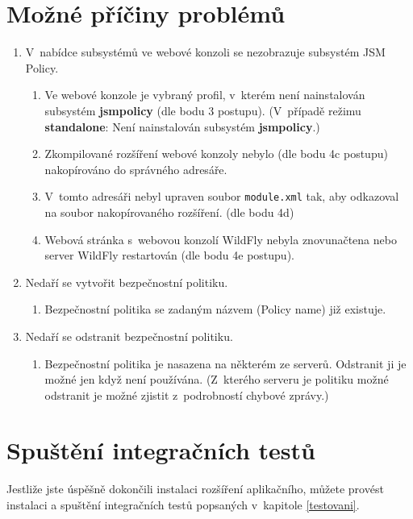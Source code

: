 \section{Možné příčiny problémů}
\begin{enumerate}
    \item V~nabídce subsystémů ve webové konzoli se nezobrazuje subsystém JSM Policy.
    \begin{enumerate}
        \item Ve webové konzole je vybraný profil, v~kterém není nainstalován subsystém {\bf jsmpolicy} (dle bodu 3 postupu). (V~případě režimu {\bf standalone}: Není nainstalován subsystém {\bf jsmpolicy}.)
        \item Zkompilované rozšíření webové konzoly nebylo (dle bodu 4c postupu) nakopírováno do správného adresáře.
        \item V~tomto adresáři nebyl upraven soubor {\tt module.xml} tak, aby odkazoval na soubor nakopírovaného rozšíření. (dle bodu 4d)
        \item Webová stránka s~webovou konzolí WildFly nebyla znovunačtena nebo server WildFly restartován (dle bodu 4e postupu).
    \end{enumerate}
    \pagebreak
    \item Nedaří se vytvořit bezpečnostní politiku.
    \begin{enumerate}
        \item Bezpečnostní politika se zadaným názvem (Policy name) již existuje.
    \end{enumerate}
    \item Nedaří se odstranit bezpečnostní politiku.
    \begin{enumerate}
        \item Bezpečnostní politika je nasazena na některém ze serverů. Odstranit ji je možné jen když není používána. (Z~kterého serveru je politiku možné odstranit je možné zjistit z~podrobností chybové zprávy.)
    \end{enumerate}
\end{enumerate}


\section{Spuštění integračních testů}

Jestliže jste úspěšně dokončili instalaci rozšíření aplikačního, můžete provést instalaci a spuštění integračních testů popsaných v~kapitole \ref{testovani}.

